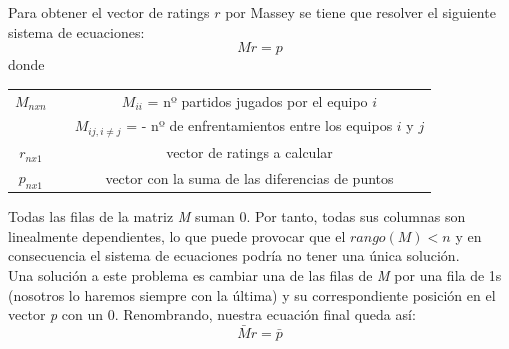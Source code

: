 Para obtener el vector de ratings $r$ por Massey se tiene que resolver el siguiente sistema de ecuaciones:
\begin{equation}
	Mr = p
\end{equation}
donde 
\begin{center}
	\begin{tabular}{ccc}
	\hline $M_{nxn}$ & & $M_{ii}$ = nº partidos jugados por el equipo $i$ \\
	& & $M_{ij, i \neq j}$ = - nº de enfrentamientos entre los equipos $i$ y $j$\\ 
	\hline  $r_{nx1}$ & & vector de ratings a calcular \\ 
	\hline  $p_{nx1}$ & & vector con la suma de las diferencias de puntos\\ 
	\hline 
\end{tabular}
\end{center} 

Todas las filas de la matriz \textit{M} suman 0. Por tanto, todas sus columnas son linealmente dependientes, lo que puede provocar que el $rango(M)<n$ y en consecuencia el sistema de ecuaciones podría no tener una única solución.\\

Una solución a este problema es cambiar una de las filas de \textit{M} por una fila de 1s (nosotros lo haremos siempre con la última) y su correspondiente posición en el vector \textit{p} con un 0.
Renombrando, nuestra ecuación final queda así:
\begin{equation}
	\bar{M}r = \bar{p}
\end{equation}

\newpage

